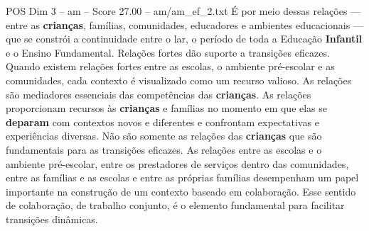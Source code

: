 \begin{textsample}{POS Dim 3 – am – Score 27.00 – am/am\_ef\_2.txt}
É por meio dessas relações — entre as \textbf{crianças}, famílias, comunidades, educadores e ambientes educacionais — que se constrói a continuidade entre o lar, o período de toda a Educação \textbf{Infantil} e o Ensino Fundamental.
Relações fortes dão suporte a transições eficazes.
Quando existem relações fortes entre as escolas, o ambiente pré-escolar e as comunidades, cada contexto é visualizado como um recurso valioso.
As relações são mediadores essenciais das competências das \textbf{crianças}.
As relações proporcionam recursos às \textbf{crianças} e famílias no momento em que elas se \textbf{deparam} com contextos novos e diferentes e confrontam expectativas e experiências diversas.
Não são somente as relações das \textbf{crianças} que são fundamentais para as transições eficazes.
As relações entre as escolas e o ambiente pré-escolar, entre os prestadores de serviços dentro das comunidades, entre as famílias e as escolas e entre as próprias famílias desempenham um papel importante na construção de um contexto baseado em colaboração.
Esse sentido de colaboração, de trabalho conjunto, é o elemento fundamental para facilitar transições dinâmicas.

\end{textsample}
